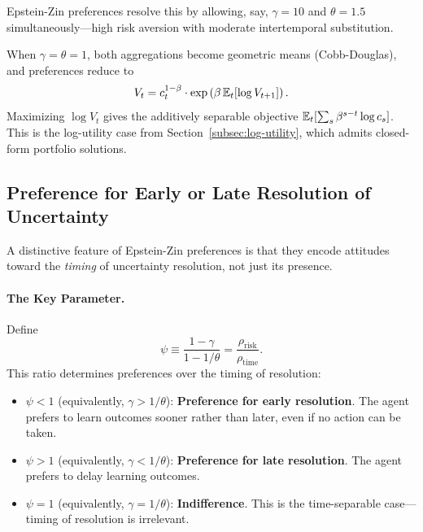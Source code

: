 Epstein-Zin preferences resolve this by allowing, say, $\gamma = 10$ and $\theta = 1.5$ simultaneously---high risk aversion with moderate intertemporal substitution.

\begin{calloutnote}
When $\gamma = \theta = 1$, both aggregations become geometric means (Cobb-Douglas), and preferences reduce to
\[
V_t = c_t^{1-\beta} \cdot \exp\left( \beta \, \mathbb{E}_t[\log V_{t+1}] \right).
\]
Maximizing $\log V_t$ gives the additively separable objective $\mathbb{E}_t[\sum_s \beta^{s-t} \log c_s]$. This is the log-utility case from Section~\ref{subsec:log-utility}, which admits closed-form portfolio solutions.
\end{calloutnote}

\subsection{Preference for Early or Late Resolution of Uncertainty}
\label{subsec:resolution-timing}

A distinctive feature of Epstein-Zin preferences is that they encode attitudes toward the \emph{timing} of uncertainty resolution, not just its presence.

\paragraph{The Key Parameter.}

Define
\begin{equation}
\psi \equiv \frac{1 - \gamma}{1 - 1/\theta} = \frac{\rho_{\text{risk}}}{\rho_{\text{time}}}.
\label{eq:psi-definition}
\end{equation}
This ratio determines preferences over the timing of resolution:
\begin{itemize}[nosep]
    \item $\psi < 1$ (equivalently, $\gamma > 1/\theta$): \textbf{Preference for early resolution}. The agent prefers to learn outcomes sooner rather than later, even if no action can be taken.
    \item $\psi > 1$ (equivalently, $\gamma < 1/\theta$): \textbf{Preference for late resolution}. The agent prefers to delay learning outcomes.
    \item $\psi = 1$ (equivalently, $\gamma = 1/\theta$): \textbf{Indifference}. This is the time-separable case---timing of resolution is irrelevant.
\end{itemize}

